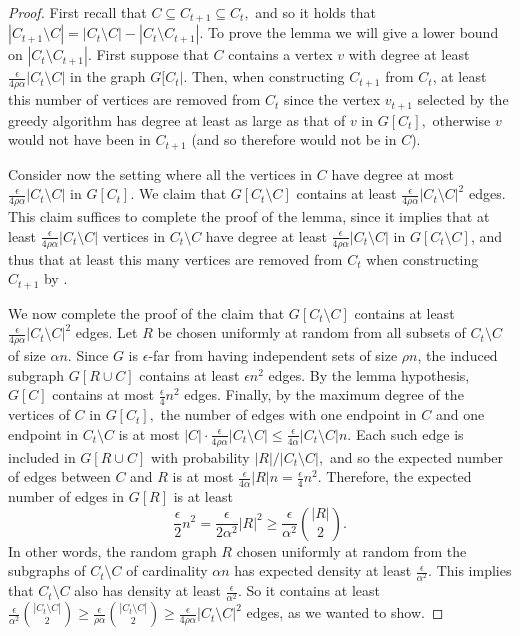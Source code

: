 \documentclass[11pt]{article}
\begin{document}
\begin{proof}
First recall that $C \subseteq C_{t+1} \subseteq C_t,$ and so it holds that $|C_{t+1} \setminus C| = |C_t\setminus C| - |C_t \setminus C_{t+1}|.$
To prove the lemma we will give a lower bound on $|C_t \setminus C_{t+1}|.$
First suppose that $C$ contains a vertex $v$ with degree at least $\frac{\epsilon}{4\rho \alpha}|C_{t} \setminus C|$ in the graph $G[C_{t}|.$
Then, when constructing $C_{t+1}$ from $C_t$, at least this number of vertices are removed from $C_t$ since the vertex $v_{t+1}$ selected by the greedy algorithm has degree at least as large as that of $v$ in $G[C_t],$ otherwise $v$ would not have been in $C_{t+1}$ (and so therefore would not be in $C$).

Consider now the setting where all the vertices in $C$ have degree at most $\frac{\epsilon}{4\rho \alpha}|C_{t} \setminus C|$ in $G[C_t]$.
We claim that $G[C_{t} \setminus C]$ contains at least $\frac{\epsilon}{4 \rho \alpha} |C_{t} \setminus C|^2$ edges. This claim suffices to complete the proof of the lemma, since it implies that at least $\frac{\epsilon}{4 \rho \alpha} |C_{t} \setminus C|$ vertices in $C_t \setminus C$ have degree at least $\frac{\epsilon}{4 \rho \alpha} |C_{t} \setminus C|$ in $G[C_t \setminus C]$, and thus that at least this many vertices are removed from $C_t$ when constructing $C_{t+1}$ by .

We now complete the proof of the claim that $G[C_{t} \setminus C]$ contains at least $\frac{\epsilon}{4 \rho \alpha} |C_{t} \setminus C|^2$ edges.
Let $R$ be chosen uniformly at random from all subsets of $C_t \setminus C$ of size $\alpha n$.
Since $G$ is $\epsilon$-far from having independent sets of size $\rho n$, the induced subgraph $G[R \cup C]$ contains at least $\epsilon n^2$ edges.
By the lemma hypothesis, $G[C]$ contains at most $\frac\epsilon4 n^2$ edges.
Finally, by the maximum degree of the vertices of $C$ in $G[C_t],$ the number of edges with one endpoint in $C$ and one endpoint in $C_t \setminus C$ is at most $|C| \cdot \frac{\epsilon}{4\rho \alpha}|C_{t} \setminus C| \leq \frac{\epsilon}{4\alpha}|C_{t} \setminus C| n.$
Each such edge is included in $G[R \cup C]$ with probability $|R| / |C_t \setminus C|,$ and so the expected number of edges between $C$ and $R$ is at most $\frac{\epsilon}{4\alpha} |R| n =\frac{\epsilon}{4}n^2$. 
Therefore, the expected number of edges in $G[R]$ is at least
\[
\frac{\epsilon}{2} n^2
= \frac{\epsilon}{2\alpha^2}|R|^2 
\geq \frac{\epsilon}{\alpha^2} \binom{|R|}{2}.
\]
In other words, the random graph $R$ chosen uniformly at random from the subgraphs of $C_t \setminus C$ of cardinality $\alpha n$ has expected density at least $\frac{\epsilon}{\alpha^2}$. This implies that $C_t \setminus C$ also has density at least $\frac{\epsilon}{\alpha^2}$. So it contains at least $\frac{\epsilon}{\alpha^2} \binom{|C_t \setminus C|}{2} \geq 
\frac{\epsilon}{\rho\alpha} \binom{|C_t \setminus C|}{2}
\ge \frac{\epsilon}{4\rho \alpha}|C_t \setminus C|^2$ edges, as we wanted to show.
\end{proof}
\end{document}
